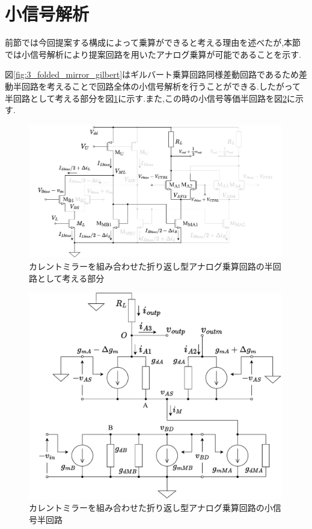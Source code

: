     \section{小信号解析}
        前節では今回提案する構成によって乗算ができると考える理由を述べたが,本節では小信号解析により提案回路を用いたアナログ乗算が可能であることを示す.\par
        図\ref{fig:3_folded_mirror_gilbert}はギルバート乗算回路同様差動回路であるため差動半回路を考えることで回路全体の小信号解析を行うことができる.したがって半回路として考える部分を図\ref{fig:3_folded_mirror_gilbert_half}に示す.また,この時の小信号等価半回路を図\ref{fig:3_folded_mirror_half}に示す.
        \begin{figure}[!b]
            \centering
            \includegraphics[width=0.99\textwidth]{figures/chapter3/NtoNFolded_half.pdf}
            \caption{カレントミラーを組み合わせた折り返し型アナログ乗算回路の半回路として考える部分}
            \label{fig:3_folded_mirror_gilbert_half}
        \end{figure}
        \begin{figure}[!b]
            \centering
            \includegraphics[width=0.99\textwidth]{figures/chapter3/NtoNHalfDiffEqual.pdf}
            \caption{カレントミラーを組み合わせた折り返し型アナログ乗算回路の小信号半回路}
            \label{fig:3_folded_mirror_half}
        \end{figure}

